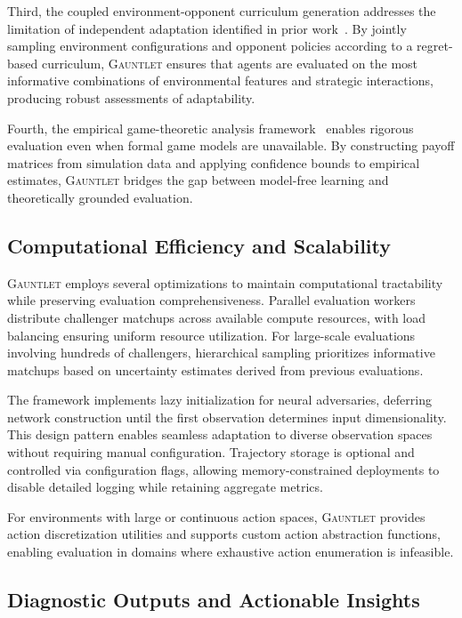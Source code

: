 \documentclass[sigconf,anonymous]{aamas}
\begin{document}
Third, the coupled environment-opponent curriculum generation addresses the limitation of independent adaptation identified in prior work~\cite{Samvelyan2023}. By jointly sampling environment configurations and opponent policies according to a regret-based curriculum, \textsc{Gauntlet} ensures that agents are evaluated on the most informative combinations of environmental features and strategic interactions, producing robust assessments of adaptability.

Fourth, the empirical game-theoretic analysis framework~\cite{Wellman2006} enables rigorous evaluation even when formal game models are unavailable. By constructing payoff matrices from simulation data and applying confidence bounds to empirical estimates, \textsc{Gauntlet} bridges the gap between model-free learning and theoretically grounded evaluation.


\subsection{Computational Efficiency and Scalability}

\textsc{Gauntlet} employs several optimizations to maintain computational tractability while preserving evaluation comprehensiveness. Parallel evaluation workers distribute challenger matchups across available compute resources, with load balancing ensuring uniform resource utilization. For large-scale evaluations involving hundreds of challengers, hierarchical sampling prioritizes informative matchups based on uncertainty estimates derived from previous evaluations.

The framework implements lazy initialization for neural adversaries, deferring network construction until the first observation determines input dimensionality. This design pattern enables seamless adaptation to diverse observation spaces without requiring manual configuration. Trajectory storage is optional and controlled via configuration flags, allowing memory-constrained deployments to disable detailed logging while retaining aggregate metrics.

For environments with large or continuous action spaces, \textsc{Gauntlet} provides action discretization utilities and supports custom action abstraction functions, enabling evaluation in domains where exhaustive action enumeration is infeasible.

\subsection{Diagnostic Outputs and Actionable Insights}
\end{document}
